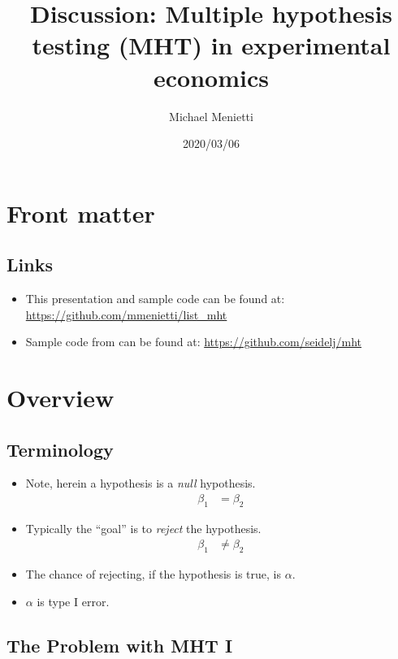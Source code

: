 \documentclass[10pt]{article}
\title{Discussion: Multiple hypothesis testing (MHT) in experimental economics}
\author{Michael Menietti}
\date{2020/03/06}
\begin{document}
	\maketitle

	\section{Front matter}
	
	\subsection{Links}
	
	\begin{itemize}
		\item This presentation and sample code can be found at: \url{https://github.com/mmenietti/list_mht}
		\item Sample code from \textcite{list_2019} can be found at: \url{https://github.com/seidelj/mht}
	\end{itemize}
	
	\section{Overview}

	\subsection{Terminology}
	
	\begin{itemize}
		\item Note, herein a hypothesis is a \emph{null} hypothesis.
			\begin{align*}
				\beta_1 &= \beta_2
			\end{align*}
		\item Typically the ``goal'' is to \emph{reject} the hypothesis.
			\begin{align*}
				\beta_1 &\not= \beta_2
			\end{align*}
		\item The chance of rejecting, if the hypothesis is true, is $\alpha$.
		\item $\alpha$ is type I error.
	\end{itemize}

	\subsection{The Problem with MHT I}
\end{document}
